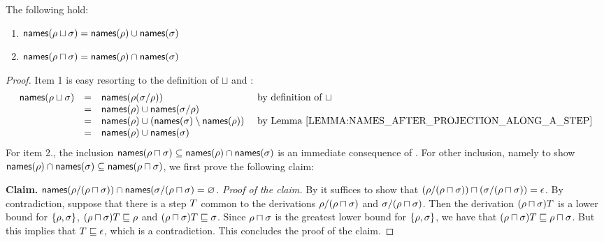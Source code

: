 \begin{proposition}
The following hold:
\begin{enumerate}
\item $\mathsf{names}(\rho \sqcup \sigma) = \mathsf{names}(\rho) \cup \mathsf{names}(\sigma)$
\item $\mathsf{names}(\rho \sqcap \sigma) = \mathsf{names}(\rho) \cap \mathsf{names}(\sigma)$
\end{enumerate}
\end{proposition}
\begin{proof}
Item 1 is easy resorting to the definition of $\sqcup$
and :
\[
  \begin{array}{rcll}
  \names(\redseq \sqcup \redseqtwo) & = & \names(\redseq(\redseqtwo/\redseq)) & \text{ by definition of $\sqcup$} \\
                                    & = & \names(\redseq) \cup \names(\redseqtwo/\redseq) \\
                                    & = & \names(\redseq) \cup (\names(\redseqtwo) \setminus \names(\redseq)) & \text{ by \rlem{names_after_projection_along_a_step}} \\
                                    & = & \names(\redseq) \cup \names(\redseqtwo) \\
  \end{array}
\]
For item 2., 
the inclusion $\mathsf{names}(\rho \sqcap \sigma) \subseteq \mathsf{names}(\rho) \cap \mathsf{names}(\sigma)$
is an immediate consequence of .
For other inclusion, namely to show  $\mathsf{names}(\rho) \cap \mathsf{names}(\sigma) \subseteq \mathsf{names}(\rho \sqcap \sigma)$,
we first prove the following claim:\medskip

{\bf Claim.} $\mathsf{names}(\rho/(\rho \sqcap \sigma)) \cap \mathsf{names}(\sigma/(\rho \sqcap \sigma) = \varnothing$.
{\em Proof of the claim.}
By  it suffices to show that
$(\rho/(\rho \sqcap \sigma)) \sqcap (\sigma/(\rho \sqcap \sigma)) = \epsilon$.
By contradiction, suppose that there is a step $T$ common to
the derivations
$\rho/(\rho \sqcap \sigma)$ and $\sigma/(\rho \sqcap \sigma)$.
Then the derivation $(\rho \sqcap \sigma)T$ is a lower bound for $\{\rho,\sigma\}$,
\ie
$(\rho \sqcap \sigma)T \sqsubseteq \rho$
and
$(\rho \sqcap \sigma)T \sqsubseteq \sigma$.
Since $\rho \sqcap \sigma$ is the greatest lower bound for $\{\rho,\sigma\}$,
we have that $(\rho \sqcap \sigma)T \sqsubseteq \rho \sqcap \sigma$.
But this implies that $T \sqsubseteq \epsilon$, which is a contradiction.
This concludes the proof of the claim.
\medskip


\end{proof}
